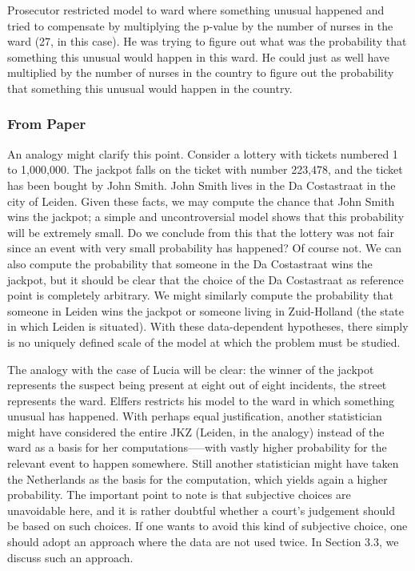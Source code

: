 \documentclass[letterpaper, landscape]{exam}
\begin{document}
  Prosecutor restricted model to ward where something unusual happened and tried
  to compensate by multiplying the p-value by the number of nurses in the ward
  (27, in this case). He was trying to figure out what was the probability that
  something this unusual would happen in this ward. He could just as well have
  multiplied by the number of nurses in the country to figure out the
  probability that something this unusual would happen in the country.

  \subsubsection{From Paper} %

  An analogy might clarify this point. Consider a lottery with tickets
  numbered 1 to 1,000,000. The jackpot falls on the ticket with number
  223,478, and the ticket has been bought by John Smith. John Smith lives in
  the Da Costastraat in the city of Leiden. Given these facts, we may compute
  the chance that John Smith wins the jackpot; a simple and uncontroversial
  model shows that this probability will be extremely small. Do we conclude
  from this that the lottery was not fair since an event with very small
  probability has happened? Of course not. We can also compute the probability
  that someone in the Da Costastraat wins the jackpot, but it should be clear
  that the choice of the Da Costastraat as reference point is completely
  arbitrary. We might similarly compute the probability that someone in Leiden
  wins the jackpot or someone living in Zuid-Holland (the state in which
  Leiden is situated). With these data-dependent hypotheses, there simply is
  no uniquely defined scale of the model at which the problem must be studied.

  The analogy with the case of Lucia will be clear: the winner of the jackpot
  represents the suspect being present at eight out of eight incidents, the
  street represents the ward. Elffers restricts his model to the ward in which
  something unusual has happened. With perhaps equal justification, another
  statistician might have considered the entire JKZ (Leiden, in the analogy)
  instead of the ward as a basis for her computations--—with vastly higher
  probability for the relevant event to happen somewhere. Still another
  statistician might have taken the Netherlands as the basis for the
  computation, which yields again a higher probability. The important point to
  note is that subjective choices are unavoidable here, and it is rather
  doubtful whether a court’s judgement should be based on such choices. If one
  wants to avoid this kind of subjective choice, one should adopt an approach
  where the data are not used twice. In Section 3.3, we discuss such an
  approach.
  
\end{document}
